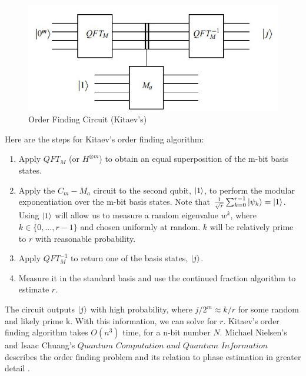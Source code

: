\documentclass[11pt]{journal}
\begin{document}
\begin{figure}[H]
    \centering
    \includegraphics[scale = 0.6]{5.JPG}
    \caption{Order Finding Circuit (Kitaev's)}
    \label{fig:my_label}
\end{figure}

Here are the steps for Kitaev's order finding algorithm:

\begin{enumerate}
    \item Apply $QFT_M$ (or $H^{\otimes m}$)  to obtain an equal superposition of the m-bit basis states.
    \item Apply the $C_m-M_a$ circuit to the second qubit, $\ket{1}$, to perform the modular exponentiation over the m-bit basis states. Note that $\frac{1}{\sqrt{r}}\sum_{k=0}^{r-1} \ket{\psi_k} = \ket{1}$. Using $\ket{1}$ will allow us to measure a random eigenvalue $w^k$, where $k \in \{0,...,r-1\}$ and chosen uniformly at random. $k$ will be relatively prime to $r$ with reasonable probability.
    \item Apply $QFT_M^{-1}$ to return one of the basis states, $\ket{j}$.
    \item Measure it in the standard basis and use the continued fraction algorithm to estimate $r$.
\end{enumerate}

The circuit outputs $\ket{j}$ with high probability, where $j/2^m \approx k/r$ for some random and likely prime k. With this information, we can solve for $r$. Kitaev's order finding algorithm takes $O(n^3)$ time, for a n-bit number $N$. Michael Nielsen's and Isaac Chuang's $\textit{Quantum Computation and Quantum Information}$ describes the order finding problem and its relation to phase estimation in greater detail \cite{book}. 
\end{document}
